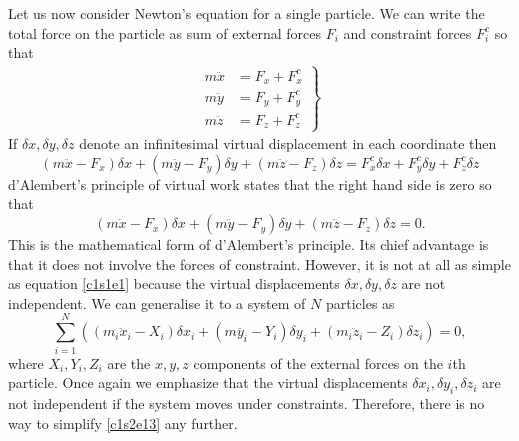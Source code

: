 Let us now consider Newton's equation for a single particle. We can write the 
total force on the particle as sum of external forces
$F_i$ and constraint forces $F^c_i$ so that
\begin{align}
\left.
\begin{array}{ll}
m\ddot{x} &= F_x + F^c_x \\
m\ddot{y} &= F_y + F^c_y \\
m\ddot{z} &= F_z + F^c_z 
\end{array}
\right\}\label{c1s2e10}
\end{align}
If $\delta x, \delta y, \delta z$ denote an infinitesimal virtual displacement 
in each coordinate then
\begin{equation}\label{c1s2e11}
(m\ddot{x} - F_x)\delta x + (m\ddot{y} - F_y)\delta y + (m\ddot{z} - F_z)
\delta z = F^c_x\delta x + F^c_y\delta y + F^c_z\delta z
\end{equation}
d'Alembert's principle of virtual work states that the right hand side is zero
so that
\begin{equation}\label{c1s2e12}
(m\ddot{x} - F_x)\delta x + (m\ddot{y} - F_y)\delta y + (m\ddot{z} - F_z)
\delta z = 0.
\end{equation}
This is the mathematical form of d'Alembert's principle. Its chief advantage 
is that it does not involve the forces of constraint. However, it is not at
all as simple as equation \eqref{c1s1e1} because the virtual displacements
$\delta x, \delta y, \delta z$ are not independent. We can generalise it to a 
system of $N$ particles as
\begin{equation}\label{c1s2e13}
\sum_{i=1}^N\left(
(m_i\ddot{x}_i - X_i)\delta x_i + (m\ddot{y_i} - Y_i)\delta y_i + 
(m_i\ddot{z}_i - Z_i) \delta z_i\right) = 0,
\end{equation}
where $X_i, Y_i, Z_i$ are the $x, y, z$ components of the external forces on
the $i$th particle. Once again we emphasize that the virtual displacements 
$\delta x_i, \delta y_i, \delta z_i$ are not independent if the system moves 
under constraints.  Therefore, there is no way to simplify \eqref{c1s2e13} 
any further.

